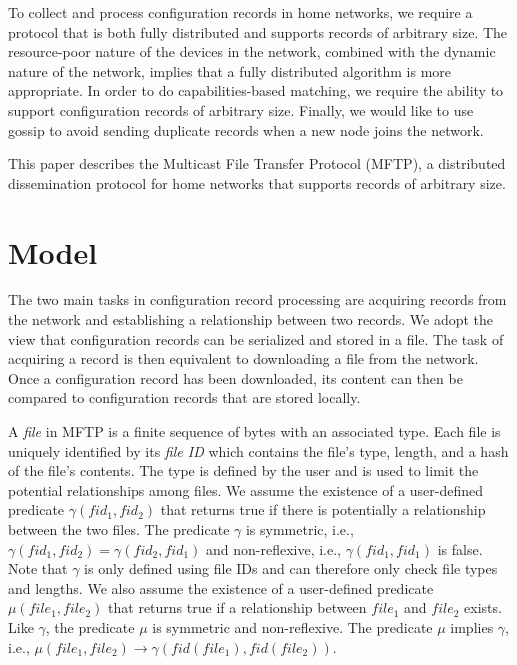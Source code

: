 \documentclass[letterpaper]{article}
\begin{document}
To collect and process configuration records in home networks, we require a protocol that is both fully distributed and supports records of arbitrary size.
The resource-poor nature of the devices in the network, combined with the dynamic nature of the network, implies that a fully distributed algorithm is more appropriate.
In order to do capabilities-based matching, we require the ability to support configuration records of arbitrary size.
Finally, we would like to use gossip to avoid sending duplicate records when a new node joins the network.

This paper describes the Multicast File Transfer Protocol (MFTP), a distributed dissemination protocol for home networks that supports records of arbitrary size.


\section{Model\label{model}}

The two main tasks in configuration record processing are acquiring records from the network and establishing a relationship between two records.
We adopt the view that configuration records can be serialized and stored in a file.
The task of acquiring a record is then equivalent to downloading a file from the network.
Once a configuration record has been downloaded, its content can then be compared to configuration records that are stored locally.

A \emph{file} in MFTP is a finite sequence of bytes with an associated type.
Each file is uniquely identified by its \emph{file ID} which contains the file's type, length, and a hash of the file's contents.
The type is defined by the user and is used to limit the potential relationships among files.
We assume the existence of a user-defined predicate $\gamma(fid_1, fid_2)$ that returns true if there is potentially a relationship between the two files.
The predicate $\gamma$ is symmetric, i.e., $\gamma(fid_1, fid_2) = \gamma(fid_2, fid_1)$ and non-reflexive, i.e., $\gamma(fid_1, fid_1)$ is false.
Note that $\gamma$ is only defined using file IDs and can therefore only check file types and lengths.
We also assume the existence of a user-defined predicate $\mu(file_1, file_2)$ that returns true if a relationship between $file_1$ and $file_2$ exists.
Like $\gamma$, the predicate $\mu$ is symmetric and non-reflexive.
The predicate $\mu$ implies $\gamma$, i.e., $\mu(file_1, file_2) \to \gamma(fid(file_1), fid(file_2))$.
\end{document}
